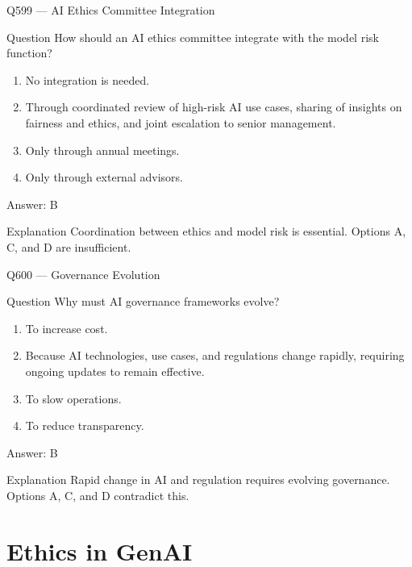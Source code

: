 \documentclass[aspectratio=169,8pt]{beamer}
\begin{document}
	\begin{frame}{Q599 --- AI Ethics Committee Integration}
		\begin{block}{Question}
			How should an AI ethics committee integrate with the model risk function?
			\begin{enumerate}
				\item No integration is needed.
				\item Through coordinated review of high-risk AI use cases, sharing of insights on fairness and ethics, and joint escalation to senior management.
				\item Only through annual meetings.
				\item Only through external advisors.
			\end{enumerate}
		\end{block}
		\begin{exampleblock}{Answer: B}\end{exampleblock}
		\begin{block}{Explanation}
			Coordination between ethics and model risk is essential. Options A, C, and D are insufficient.
		\end{block}
	\end{frame}
	
	\begin{frame}{Q600 --- Governance Evolution}
		\begin{block}{Question}
			Why must AI governance frameworks evolve?
			\begin{enumerate}
				\item To increase cost.
				\item Because AI technologies, use cases, and regulations change rapidly, requiring ongoing updates to remain effective.
				\item To slow operations.
				\item To reduce transparency.
			\end{enumerate}
		\end{block}
		\begin{exampleblock}{Answer: B}\end{exampleblock}
		\begin{block}{Explanation}
			Rapid change in AI and regulation requires evolving governance. Options A, C, and D contradict this.
		\end{block}
	\end{frame}
	
	\section{Ethics in GenAI}
	
\end{document}

